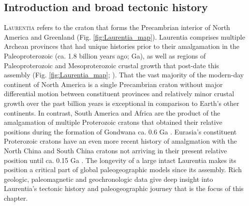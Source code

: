 \documentclass[twocolumn, switch]{article} %
\begin{document}
\subsection{Introduction and broad tectonic history}
\lettrine[lines=2]{L}{aurentia} refers to the craton that forms the Precambrian interior of North America and Greenland (Fig. \ref{fig:Laurentia_map}). Laurentia comprises multiple Archean provinces that had unique histories prior to their amalgamation in the Paleoproterozoic (ca. 1.8 billion years ago; Ga), as well as regions of Paleoproterozoic and Mesoproterozoic crustal growth that post-date this assembly (Fig. \ref{fig:Laurentia_map}; \citealp{Hoffman1989c, Whitmeyer2007a}). That the vast majority of the modern-day continent of North America is a single Precambrian craton without major differential motion between constituent provinces and relatively minor crustal growth over the past billion years is exceptional in comparison to Earth's other continents. In contrast, South America and Africa are the product of the amalgamation of multiple Proterozoic cratons that obtained their relative positions during the formation of Gondwana ca. 0.6 Ga \citep{Goscombe2019a}. Eurasia's constituent Proterozoic cratons have an even more recent history of amalgmation with the North China and South China cratons not arriving in their present relative position until ca. 0.15 Ga \citep{Van-der-Voo2015a,Torsvik2017a}. The longevity of a large intact Laurentia makes its position a critical part of global paleogeographic models since its assembly. Rich geologic, paleomagnetic and geochronologic data give deep insight into Laurentia's tectonic history and paleogeographic journey that is the focus of this chapter.
\end{document}

